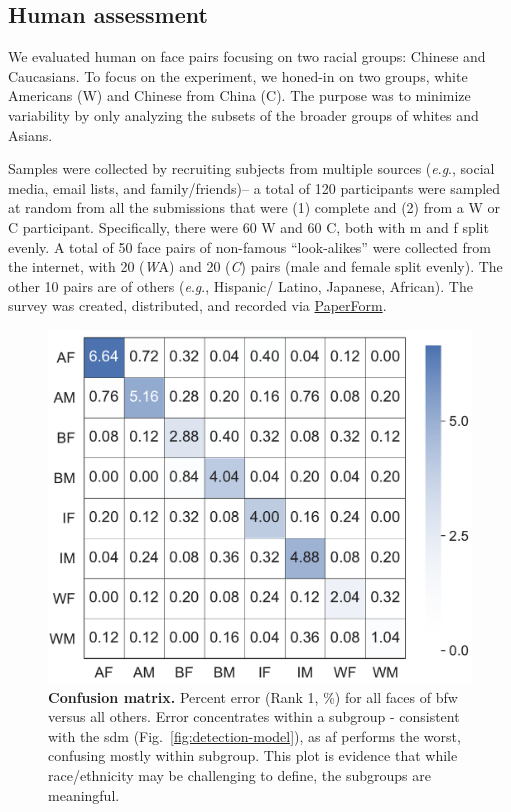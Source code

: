 \documentclass[10pt,twocolumn,letterpaper]{article}
\newcommand{\eg}{\textit{e}.\textit{g}., }
\begin{document}
\subsection{Human assessment}\label{subsec:human-assessment}
We evaluated human on face pairs focusing on two racial groups: Chinese and Caucasians. To focus on the experiment, we honed-in on two groups, white Americans (W) and Chinese from China (C). The purpose was to minimize variability by only analyzing the subsets of the broader groups of whites and Asians. 

Samples were collected by recruiting subjects from multiple sources (\eg social media, email lists, and family/friends)-- a total of 120 participants were sampled at random from all the submissions that were (1) complete and (2) from a W or C participant. Specifically, there were 60 W and 60 C, both with \gls{m} and \gls{f} split evenly. A total of 50 face pairs of non-famous ``look-alikes'' were collected from the internet, with 20 ({\emph WA}) and 20 ({\emph C}) pairs (male and female split evenly). The other 10 pairs are of others (\eg Hispanic/ Latino, Japanese, African). The survey was created, distributed, and recorded via \href{https://paperform.co}{PaperForm}. 


\begin{figure}[t!]
	\centering    
	\includegraphics[width=.75\linewidth]{figures/confusion.pdf}
		\caption{\small{\textbf{Confusion matrix.} Percent error (Rank 1, \%) for all faces of \gls{bfw} versus all others. Error concentrates within a subgroup - consistent with the \gls{sdm} (Fig.~\ref{fig:detection-model}), as \gls{af} performs the worst, confusing mostly within subgroup. This plot is evidence that while race/ethnicity may be challenging to define, the subgroups are meaningful.}}
		\label{fig:confusion} 
\end{figure} 
\end{document}
